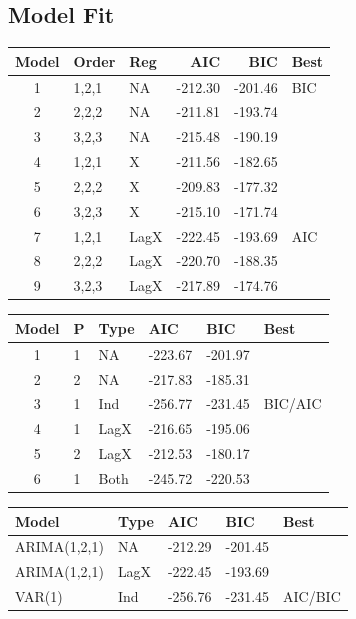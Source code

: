 \documentclass[twoside,twocolumn]{article}
\begin{document}
      \subsection{Model Fit}
      
\begin{table}[ht]
\centering
\begin{tabular}{cllrrl}
  \hline
 Model & Order & Reg  & AIC & BIC & Best \\ 
  \hline
1 & 1,2,1 &  NA &   -212.30 & -201.46 & BIC \\ 
  2  & 2,2,2 & NA   & -211.81 & -193.74 &  \\ 
  3  & 3,2,3 &  NA  & -215.48 & -190.19 &  \\ 
  4  & 1,2,1 & X  & -211.56 & -182.65 &  \\ 
  5  & 2,2,2 & X   & -209.83 & -177.32 &  \\ 
  6  & 3,2,3 & X   & -215.10 & -171.74 &  \\ 
  7  & 1,2,1 &  LagX & -222.45 & -193.69 & AIC \\ 
  8  & 2,2,2 &  LagX & -220.70 & -188.35 &  \\ 
  9  & 3,2,3 &  LagX & -217.89 & -174.76 &  \\ 
   \hline
\end{tabular}
\end{table}

\begin{table}[ht]
\centering
\begin{tabular}{clllll}
  \hline
 Model & P & Type &  AIC & BIC & Best \\ 
  \hline
1  & 1 & NA  &  -223.67 & -201.97 &  \\ 
  2  & 2 & NA  &   -217.83 & -185.31 &  \\ 
  3  & 1 & Ind  & -256.77 & -231.45 & BIC/AIC \\ 
  4  & 1 & LagX & -216.65 & -195.06 &  \\ 
  5  & 2 & LagX & -212.53 & -180.17 &  \\ 
  6  & 1 & Both  & -245.72 & -220.53 &  \\ 
   \hline
\end{tabular}
\end{table}

\begin{table}[ht]
\centering
\begin{tabular}{lllll}
  \hline
Model & Type & AIC & BIC & Best \\ 
  \hline
ARIMA(1,2,1) & NA &   -212.29 & -201.45 &  \\ 
ARIMA(1,2,1) & LagX   & -222.45 & -193.69 &  \\ 
VAR(1) & Ind & -256.76 & -231.45 & AIC/BIC \\ 
   \hline
\end{tabular}
\end{table}
\end{document}
